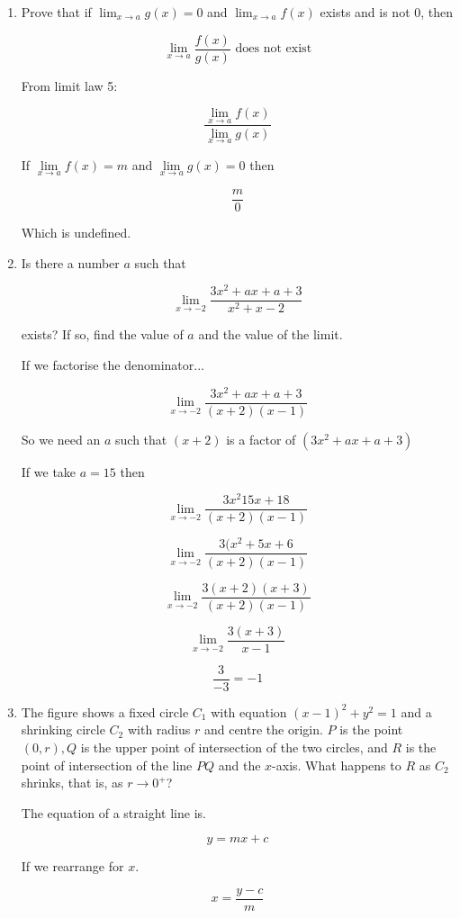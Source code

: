 \documentclass{article}
\begin{document}
\begin{enumerate}
		\item Prove that if $\lim _{x \to a} g(x) = 0$ and $\lim _{x \to a} f(x)$ exists and is not
			0, then

			$$\lim \limits _{x \to a} \frac{f(x)}{g(x)} \text{ does not exist}$$

			From limit law 5:

			$$\frac{\lim \limits _{x \to a} f(x)}{\lim \limits _{x \to a} g(x)}$$

			If $\lim \limits _{x \to a} f(x) = m$ and $\lim \limits _{x \to a} g(x) = 0$
			then

			$$\frac{m}{0}$$

			Which is undefined.

		\item Is there a number $a$ such that

			$$\lim \limits _{x \to -2} \frac{3x^2 + ax +a +3}{x^2 + x - 2}$$

			exists? If so, find the value of $a$ and the value of the limit.

			If we factorise the denominator...

			$$\lim \limits _{x \to -2} \frac{3x^2 + ax + a + 3}{(x+2)(x-1)}$$

		So we need an $a$ such that $(x+2)$ is a factor of $(3x^2 + ax + a +3)$

			If we take $a = 15$ then

			$$\lim \limits _{x \to -2} \frac{3x^2 15x + 18}{(x+2)(x-1)}$$	

			$$\lim \limits _{x \to -2} \frac{3(x^2 +5x + 6}{(x+2)(x-1)}$$

			$$\lim \limits _{x \to -2} \frac{3(x+2)(x+3)}{(x+2)(x-1)}$$

			$$\lim \limits _{x \to -2} \frac{3(x+3)}{x-1}$$

			$$\frac{3}{-3} = -1$$

		\item The figure shows a fixed circle $C_1$ with equation $(x-1)^2 + y^2 = 1$
			and a shrinking circle $C_2$ with radius $r$ and centre the origin. $P$
			is the point $(0, r), Q$ is the upper point of intersection of the two
			circles, and $R$ is the point of intersection of the line $PQ$ and the
			$x$-axis. What happens to $R$ as $C_2$ shrinks, that is, as $r \to 0^{+}$?

			The equation of a straight line is.

			$$y = mx + c$$

			If we rearrange for $x$.

			$$x = \frac{y - c}{m}$$


\end{enumerate}
\end{document}
